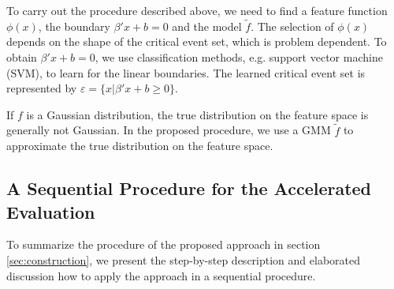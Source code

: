 \documentclass[letterpaper, 10 pt, journal]{IEEEtran}  %
\begin{document}
To carry out the procedure described above, we need to find a feature function $\phi(x)$, the boundary $\beta'x+b=0$ and the model $\tilde{f}$. The selection of $\phi(x)$ depends on the shape of the critical event set, which is problem dependent. To obtain $\beta'x+b=0$, we use classification methods, e.g. support vector machine (SVM), to learn for the linear boundaries. The learned critical event set is represented by $\varepsilon=\{x|\beta'x+b\geq 0\}$.

If $f$ is a Gaussian distribution, the true distribution on the feature space is generally not Gaussian. In the proposed procedure, we use a GMM $\tilde{f}$ to approximate the true distribution on the feature space.

\subsection{A Sequential Procedure for the Accelerated Evaluation}\label{sec:senquential}

To summarize the procedure of the proposed approach in section \ref{sec:construction}, we present the step-by-step description and elaborated discussion how to apply the approach in a sequential procedure.
\end{document}
